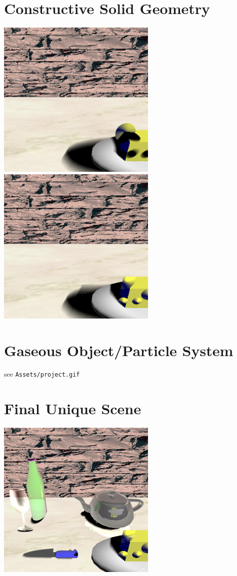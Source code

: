 \documentclass{article}
\begin{document}
\section{Constructive Solid Geometry}
\includegraphics[width=3in]{Assets/no_csg.png}
\includegraphics[width=3in]{Assets/csg.png}

\section{Gaseous Object/Particle System}
see \texttt{Assets/project.gif}

\section{Final Unique Scene}
\includegraphics[width=3in]{screenshot.png}
\end{document}
